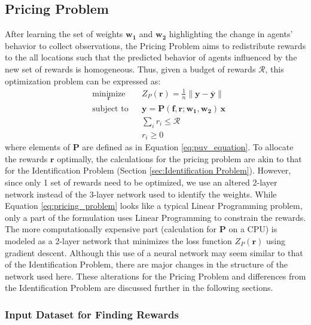 \documentclass[12pt]{article}
\newcommand{\vect}[1]{\mathbf{#1}}  %
\newcommand{\matr}[1]{\mathbf{#1}}  %
\newcommand{\mean}[1]{\overline{#1}}    %
\begin{document}
    \subsection{Pricing Problem} \label{sec:Pricing Problem}
    After learning the set of weights $\matr{w_1}$ and $\matr{w_2}$ highlighting the change in agents' behavior to collect observations, the Pricing Problem aims to redistribute rewards to the all locations such that the predicted behavior of agents influenced by the new set of rewards is homogeneous. Thus, given a budget of rewards $\mathcal{R}$, this optimization problem can be expressed as:
    \begin{equation} \label{eq:pricing_problem}
    \begin{aligned}
    & \underset{\vect{r}}{\text{minimize}}
    & & Z_P(\vect{r}) = \frac{1}{n}\lVert \vect{y} - \mean{\vect{y}} \rVert\\
    & \text{subject to}
    & & \vect{y} = \matr{P}(\matr{f}, \vect{r}; \matr{w_1}, \matr{w_2}) \, \vect{x}\\
    &&& \sum_{i} r_i \leq \mathcal{R}\\
    &&& r_i \geq 0
    \end{aligned}
    \end{equation}
    where elements of $\matr{P}$ are defined as in Equation \ref{eq:puv_equation}. 
    To allocate the rewards $\vect{r}$ optimally, the calculations for the pricing problem are akin to that for the Identification Problem (Section \ref{sec:Identification Problem}). However, since only 1 set of rewards need to be optimized, we use an altered 2-layer network instead of the 3-layer network used to identify the weights. While Equation \ref{eq:pricing_problem} looks like a typical Linear Programming problem, only a part of the formulation uses Linear Programming to constrain the rewards. The more computationally expensive part (calculation for $\matr{P}$ on a CPU) is modeled as a 2-layer network that minimizes the loss function $Z_P(\vect{r})$ using gradient descent. Although this use of a neural network may seem similar to that of the Identification Problem, there are major changes in the structure of the network used here. These alterations for the Pricing Problem and differences from the Identification Problem are discussed further in the following sections.
    
    \subsubsection{Input Dataset for Finding Rewards}
    
\end{document}
